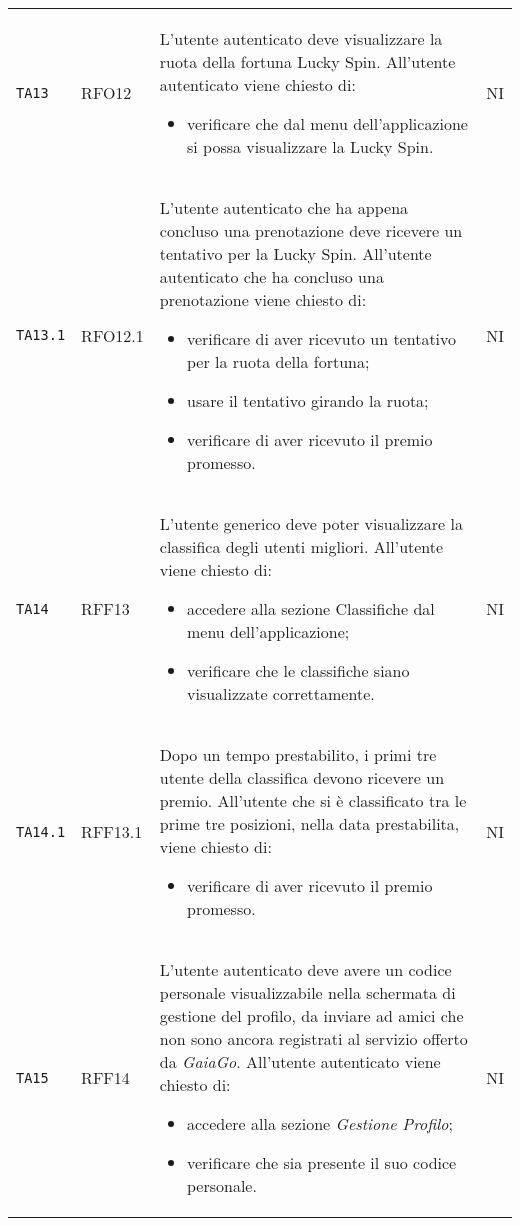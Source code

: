 \begin{longtable}{ >{\centering}p{} >{\centering}p{} >{\centering}p{}
			>{\centering}p{}}
		 \texttt{TA13} & RFO12 &	L'utente autenticato deve visualizzare la ruota della fortuna Lucky Spin\glo. All'utente autenticato viene chiesto di:
		 \begin{itemize}
		 	\item verificare che dal menu dell'applicazione si possa visualizzare la Lucky Spin.
		 \end{itemize}	&	NI	\tabularnewline		 
		 \texttt{TA13.1}	& RFO12.1 &	L'utente autenticato che ha appena concluso una prenotazione deve ricevere un tentativo per la Lucky Spin\glo. All'utente autenticato che ha concluso una prenotazione viene chiesto di:
		 \begin{itemize}
		 	\item verificare di aver ricevuto un tentativo per la ruota della fortuna;
		 	\item usare il tentativo girando la ruota;
		 	\item verificare di aver ricevuto il premio promesso.
		 \end{itemize}	&	NI	\tabularnewline	
		  \texttt{TA14}	& RFF13 &	L'utente generico deve poter visualizzare la classifica degli utenti migliori. All'utente viene chiesto di:
		 \begin{itemize}
		 	\item accedere alla sezione Classifiche dal menu dell'applicazione;
		 	\item verificare che le classifiche siano visualizzate correttamente.
		 \end{itemize}	&	NI	\tabularnewline	
		 \texttt{TA14.1}	& RFF13.1 & Dopo un tempo prestabilito, i primi tre utente della classifica devono ricevere un premio. All'utente che si è classificato tra le prime tre posizioni, nella data prestabilita, viene chiesto di:
		 \begin{itemize}
		 	\item verificare di aver ricevuto il premio promesso.
		 \end{itemize}	&	NI	\tabularnewline	
		 \texttt{TA15}	& RFF14 &	L'utente autenticato deve avere un codice personale visualizzabile nella schermata di gestione del profilo, da inviare ad amici che non sono ancora registrati al servizio offerto da \textit{GaiaGo}.  All'utente autenticato viene chiesto di:
		 \begin{itemize}
		 	\item accedere alla sezione \textit{Gestione Profilo};
		 	\item verificare che sia presente il suo codice personale.
		 \end{itemize}	&	NI	\tabularnewline

\end{longtable}
